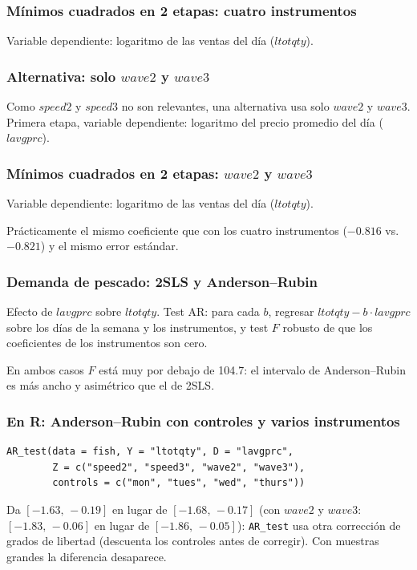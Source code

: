 \documentclass[t, compress, spanish, aspectratio=169]{beamer}
\begin{document}
\begin{frame}
	\frametitle{M\'inimos cuadrados en 2 etapas: cuatro instrumentos}
	Variable dependiente: logaritmo de las ventas del d\'ia ($ltotqty$).
	\begin{center}
	\footnotesize\renewcommand{\arraystretch}{0.9}
	
	\end{center}
\end{frame}
\begin{frame}
	\frametitle{Alternativa: solo $wave2$ y $wave3$}
	Como $speed2$ y $speed3$ no son relevantes, una alternativa usa solo $wave2$ y $wave3$. Primera etapa, variable dependiente: logaritmo del precio promedio del d\'ia ($lavgprc$).
	\begin{center}
	\footnotesize\renewcommand{\arraystretch}{0.9}
	
	\end{center}
\end{frame}
\begin{frame}
	\frametitle{M\'inimos cuadrados en 2 etapas: $wave2$ y $wave3$}
	Variable dependiente: logaritmo de las ventas del d\'ia ($ltotqty$).
	\begin{center}
	\footnotesize\renewcommand{\arraystretch}{0.9}
	
	\end{center}
	\small
	Pr\'acticamente el mismo coeficiente que con los cuatro instrumentos ($-0.816$ vs.\ $-0.821$) y el mismo error est\'andar.
\end{frame}
\begin{frame}
	\frametitle{Demanda de pescado: 2SLS y Anderson--Rubin}
	\vspace*{-0.6em}
	Efecto de $lavgprc$ sobre $ltotqty$. Test AR: para cada $b$, regresar $ltotqty-b\cdot lavgprc$ sobre los d\'ias de la semana y los instrumentos, y test $F$ robusto de que los coeficientes de los instrumentos son cero.
	\begin{center}
	\small
	
	\end{center}
	\small
	En ambos casos $F$ est\'a muy por debajo de 104.7: el intervalo de Anderson--Rubin es m\'as ancho y asim\'etrico que el de 2SLS.
\end{frame}
\begin{frame}[fragile]
	\frametitle{En R: Anderson--Rubin con controles y varios instrumentos}
\footnotesize
\begin{verbatim}
AR_test(data = fish, Y = "ltotqty", D = "lavgprc",
        Z = c("speed2", "speed3", "wave2", "wave3"),
        controls = c("mon", "tues", "wed", "thurs"))
\end{verbatim}
\small
Da $[-1.63,\,-0.19]$ en lugar de $[-1.68,\,-0.17]$ (con $wave2$ y $wave3$: $[-1.83,\,-0.06]$ en lugar de $[-1.86,\,-0.05]$): \texttt{AR\_test} usa otra correcci\'on de grados de libertad (descuenta los controles antes de corregir). Con muestras grandes la diferencia desaparece.
\end{frame}
\end{document}
